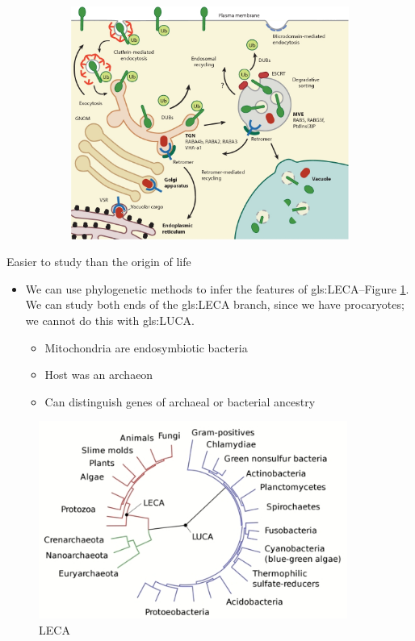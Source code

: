 \documentclass[]{article}
\begin{document}
\begin{figure}[H]
\begin{subfigure}[b]{0.45\textwidth}
	\includegraphics[width=\textwidth]{Regulation2}
	\end{subfigure}
\end{figure}
Easier to study than the
origin of life

\begin{itemize}
	\item We can use phylogenetic methods to infer the features of \gls{gls:LECA}--Figure \ref {fig:LECA}. We can study both ends of the \gls{gls:LECA} branch, since we have procaryotes; we cannot do this with \gls{gls:LUCA}.
	\begin{itemize}
		\item Mitochondria are endosymbiotic bacteria\cite{germot1996presence}
		\item Host was an archaeon\cite{spang2015complex}
		\item Can distinguish genes of archaeal or
		bacterial ancestry\cite{thiergart2012evolutionary}
	\end{itemize}
\end{itemize}

\begin{figure}[H]
	\caption{LECA}\label{fig:LECA}
	\includegraphics[width=0.9\textwidth]{LECA}
\end{figure}
\end{document}
